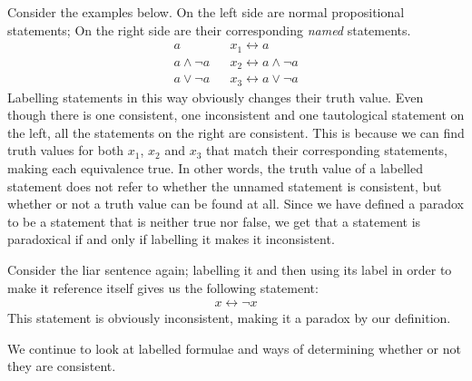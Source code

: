 Consider the examples below.
On the left side are normal propositional statements;
On the right side are their corresponding \textit{named} statements.
\begin{align}
  a               && x_1 \leftrightarrow a\\
  a \wedge \neg a && x_2 \leftrightarrow a \wedge \neg a\\
  a \vee \neg a   && x_3 \leftrightarrow a \vee \neg a
\end{align}
Labelling statements in this way obviously changes their truth value.
Even though there is one consistent, one inconsistent and one tautological statement on the left, all the statements on the right are consistent.
This is because we can find truth values for both $x_1$, $x_2$ and $x_3$ that match their corresponding statements, making each equivalence true.
In other words, the truth value of a labelled statement does not refer to whether the unnamed statement is consistent, but whether or not a truth value can be found at all.
Since we have defined a paradox to be a statement that is neither true nor false, we get that a statement is paradoxical if and only if labelling it makes it inconsistent.

Consider the liar sentence again;
labelling it and then using its label in order to make it reference itself gives us the following statement:
\begin{align}
  x \leftrightarrow \neg x
\end{align}
This statement is obviously inconsistent, making it a paradox by our definition.

We continue to look at labelled formulae and ways of determining whether or not they are consistent.
